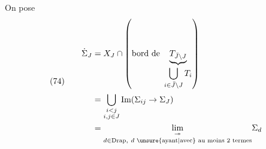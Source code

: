 On pose
\[
(74)\qquad\begin{aligned}
\dot\Sigma_J&=X_J\cap\left(\text{bord de }\underbrace{T_{\bar J\setminus J}}_{\displaystyle\bigcup_{i\in\bar J\setminus J}T_i}\right)\\
&=\bigcup_{\substack{i<j\\i,j\in J}}\operatorname{Im}(\Sigma_{ij}\to\Sigma_J)\\
&=\underset{\substack{d\in\mathrm{Drap},\ d\text{ \unsure{ayant|avec} au moins 2 termes}}}{\lim_{\twoheadrightarrow}}\Sigma_d
\end{aligned}
\]
